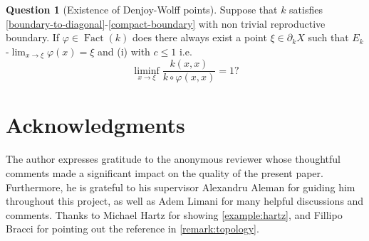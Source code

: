 \documentclass[leqno, final]{article}
\theoremstyle{definition}
\newtheorem{question}{Question}
\newcommand{\rand}{\partial}
\renewcommand{\phi}{\varphi}
\DeclareMathOperator{\Fact}{Fact}
\begin{document}
\begin{question}[Existence of Denjoy-Wolff points]
Suppose that $k$ satisfies \ref{boundary-to-diagonal}-\ref{compact-boundary}
with non trivial reproductive boundary. If $\phi\in\Fact(k)$ does there
always exist a point $\xi\in\rand_kX$ such that $E_k$-$\lim_{x\to\xi}\phi(x)=\xi$
and (i) with $c\leq1$ i.e. \begin{equation}
	\liminf_{x\to\xi}\frac{k(x,x)}{k\circ\phi(x,x)}=1?
\end{equation}
\end{question}

\section*{\large\centering Acknowledgments}
The author expresses gratitude to the anonymous reviewer whose thoughtful
comments made a significant impact on the quality of the present paper.
Furthermore, he is grateful to his supervisor Alexandru Aleman for guiding him
throughout this project, as well as Adem Limani for many helpful discussions and
comments. Thanks to Michael Hartz for showing \cref{example:hartz}, and Fillipo
Bracci for pointing out the reference in \cref{remark:topology}.


\printbibliography
\end{document}

